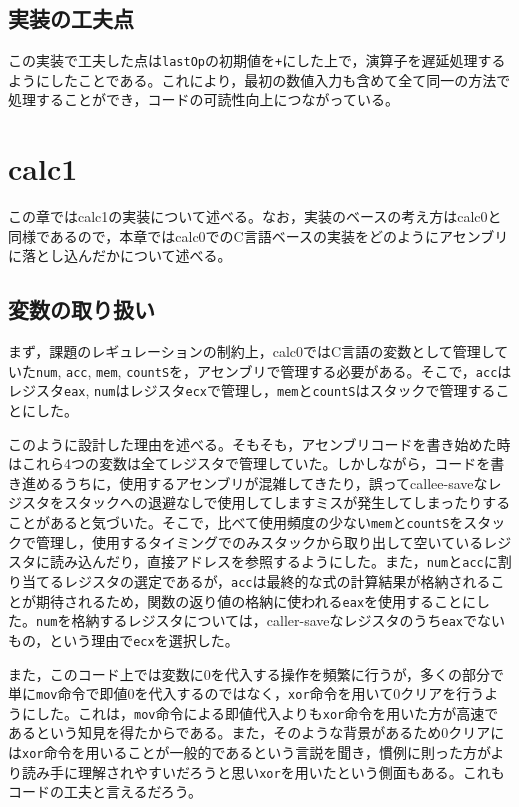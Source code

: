 \documentclass[a4paper]{jsarticle}
\newcommand{\var}[1]{\texttt{#1}}
\begin{document}
\subsection{実装の工夫点}
この実装で工夫した点は\var{lastOp}の初期値を\var{+}にした上で，演算子を遅延処理するようにしたことである。これにより，最初の数値入力も含めて全て同一の方法で処理することができ，コードの可読性向上につながっている。

\section{calc1}
この章ではcalc1の実装について述べる。なお，実装のベースの考え方はcalc0と同様であるので，本章ではcalc0でのC言語ベースの実装をどのようにアセンブリに落とし込んだかについて述べる。

\subsection{変数の取り扱い}
まず，課題のレギュレーションの制約上，calc0ではC言語の変数として管理していた\var{num}, \var{acc}, \var{mem}, \var{countS}を，アセンブリで管理する必要がある。そこで，\var{acc}はレジスタ\var{eax}, \var{num}はレジスタ\var{ecx}で管理し，\var{mem}と\var{countS}はスタックで管理することにした。

このように設計した理由を述べる。そもそも，アセンブリコードを書き始めた時はこれら4つの変数は全てレジスタで管理していた。しかしながら，コードを書き進めるうちに，使用するアセンブリが混雑してきたり，誤ってcallee-saveなレジスタをスタックへの退避なしで使用してしますミスが発生してしまったりすることがあると気づいた。そこで，比べて使用頻度の少ない\var{mem}と\var{countS}をスタックで管理し，使用するタイミングでのみスタックから取り出して空いているレジスタに読み込んだり，直接アドレスを参照するようにした。また，\var{num}と\var{acc}に割り当てるレジスタの選定であるが，\var{acc}は最終的な式の計算結果が格納されることが期待されるため，関数の返り値の格納に使われる\var{eax}を使用することにした。\var{num}を格納するレジスタについては，caller-saveなレジスタのうち\var{eax}でないもの，という理由で\var{ecx}を選択した。

また，このコード上では変数に0を代入する操作を頻繁に行うが，多くの部分で単に\var{mov}命令で即値0を代入するのではなく，\var{xor}命令を用いて0クリアを行うようにした。これは，\var{mov}命令による即値代入よりも\var{xor}命令を用いた方が高速であるという知見を得たからである。また，そのような背景があるため0クリアには\var{xor}命令を用いることが一般的であるという言説を聞き，慣例に則った方がより読み手に理解されやすいだろうと思い\var{xor}を用いたという側面もある。これもコードの工夫と言えるだろう。
\end{document}
